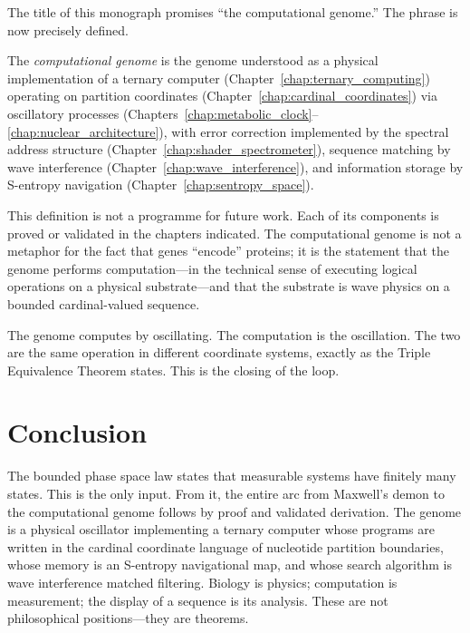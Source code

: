 The title of this monograph promises ``the computational genome.'' The phrase
is now precisely defined.

\begin{definition}
\label{def:computational_genome}
The \emph{computational genome} is the genome understood as a physical
implementation of a ternary computer (Chapter~\ref{chap:ternary_computing})
operating on partition coordinates (Chapter~\ref{chap:cardinal_coordinates})
via oscillatory processes (Chapters~\ref{chap:metabolic_clock}--\ref{chap:nuclear_architecture}),
with error correction implemented by the spectral address structure
(Chapter~\ref{chap:shader_spectrometer}), sequence matching by wave interference
(Chapter~\ref{chap:wave_interference}), and information storage by S-entropy
navigation (Chapter~\ref{chap:sentropy_space}).
\end{definition}

This definition is not a programme for future work. Each of its components is
proved or validated in the chapters indicated. The computational genome is not
a metaphor for the fact that genes ``encode'' proteins; it is the statement
that the genome performs computation---in the technical sense of executing
logical operations on a physical substrate---and that the substrate is wave
physics on a bounded cardinal-valued sequence.

The genome computes by oscillating. The computation is the oscillation. The
two are the same operation in different coordinate systems, exactly as the
Triple Equivalence Theorem states. This is the closing of the loop.

\section{Conclusion}
\label{sec:conclusion}

The bounded phase space law states that measurable systems have finitely many
states. This is the only input. From it, the entire arc from Maxwell's demon
to the computational genome follows by proof and validated derivation. The genome
is a physical oscillator implementing a ternary computer whose programs are
written in the cardinal coordinate language of nucleotide partition boundaries,
whose memory is an S-entropy navigational map, and whose search algorithm is
wave interference matched filtering. Biology is physics; computation is
measurement; the display of a sequence is its analysis. These are not
philosophical positions---they are theorems.

